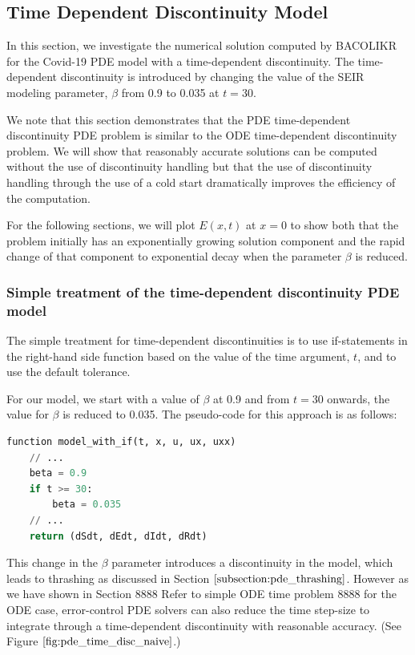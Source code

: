 \documentclass{article}
\begin{document}
\subsection{Time Dependent Discontinuity Model}
\label{subsection:pde_time_intro}
In this section, we investigate the numerical solution computed by BACOLIKR for the Covid-19 PDE model with a time-dependent discontinuity. The time-dependent discontinuity is introduced by changing the value of the SEIR modeling parameter, $\beta$ from 0.9 to 0.035 at $t=30$.

We note that this section demonstrates that the PDE time-dependent discontinuity PDE problem is similar to the ODE time-dependent discontinuity problem. We will show that reasonably accurate solutions can be computed without the use of discontinuity handling but that the use of discontinuity handling through the use of a cold start dramatically improves the efficiency of the computation.

For the following sections, we will plot $E(x, t)$ at $x=0$ to show both that the problem initially has an exponentially growing solution component and the rapid change of that component to exponential decay when the parameter $\beta$ is reduced.

\subsubsection{Simple treatment of the time-dependent discontinuity PDE model}
\label{subsubsection:pde_time_naive}
The simple treatment for time-dependent discontinuities is to use if-statements in the right-hand side function based on the value of the time argument, $t$, and to use the default tolerance.

For our model, we start with a value of $\beta$ at 0.9 and from $t=30$ onwards, the value for $\beta$ is reduced to 0.035. The pseudo-code for this approach is as follows:

\begin{minipage}{\linewidth}
\begin{lstlisting}[language=Python]
function model_with_if(t, x, u, ux, uxx)
	// ...
	beta = 0.9
	if t >= 30:
		beta = 0.035
	// ...
	return (dSdt, dEdt, dIdt, dRdt)

\end{lstlisting}
\end{minipage}

This change in the $\beta$ parameter introduces a discontinuity in the model, which leads to thrashing as discussed in Section $\ref{subsection:pde_thrashing}$. However as we have shown in Section 8888 Refer to simple ODE time problem 8888 for the ODE case, error-control PDE solvers can also reduce the time step-size to integrate through a time-dependent discontinuity with reasonable accuracy. (See Figure $\ref{fig:pde_time_disc_naive}$.)
\end{document}
